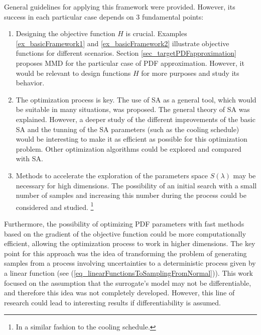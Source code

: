 General guidelines for applying this framework were provided.
However, its success in each particular case depends on 3 fundamental points:
\begin{enumerate}
\item Designing the objective function $H$ is crucial.%
Examples \ref{ex_basicFramework1} and \ref{ex_basicFramework2}
illustrate objective functions for different scenarios. 
Section \ref{sec_targetPDFapproximation} proposes MMD for the particular case of PDF approximation.
However, it would be relevant to design functions $H$ for more purposes and study its behavior.
\item The optimization process is key. The use of SA as a general tool, which would be suitable in many situations, was proposed. 
The general theory of SA was explained.
However, a deeper study of the different improvements of the basic SA and the tunning of the SA parameters (such as the cooling schedule) would be interesting to make it as efficient as possible for this optimization problem.
Other optimization algorithms could be explored and compared with SA. 
\item Methods to accelerate the exploration of the parameters space $S(\lambda)$ may be necessary for high dimensions. 
The possibility of an initial search with a small number of samples and increasing this number during the process could be considered and studied.
\footnote{In a similar fashion to the cooling schedule.}
\end{enumerate}

Furthermore, the possibility of optimizing PDF parameters with fast methods based on the gradient of the objective function could be more computationally efficient, allowing the optimization process to work in higher dimensions.
The key point for this approach was the idea of transforming the problem of generating samples from a process involving uncertainties to a deterministic process given by a linear function (see (\ref{eq_linearFunctionsToSamplingFromNormal})).
This work focused on the assumption that the surrogate's model may not be differentiable, and therefore this idea was not completely developed.
However, this line of research could lead to interesting results if differentiability is assumed.

